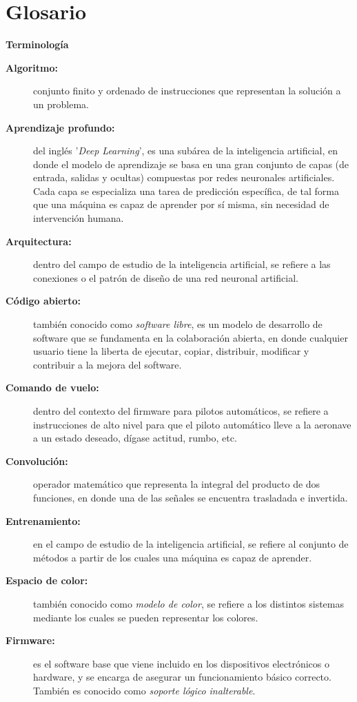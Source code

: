 \chapter*{Glosario}

\textbf{  \normalsize Terminología}
\begin{description}
  \item[\textbf{Algoritmo:}] conjunto finito y ordenado de instrucciones que representan la solución a un problema.
  \item[\textbf{Aprendizaje profundo:}] del inglés '\textit{Deep Learning}', es una subárea de la inteligencia artificial, en donde el modelo de aprendizaje se basa en una gran conjunto de capas (de entrada, salidas y ocultas) compuestas por redes neuronales artificiales. Cada capa se especializa una tarea de predicción específica, de tal forma que una máquina es capaz de aprender por sí misma, sin necesidad de intervención humana.
  \item[\textbf{Arquitectura:}] dentro del campo de estudio de la inteligencia artificial, se refiere a las conexiones o el patrón de diseño de una red neuronal artificial.
  \item[\textbf{Código abierto:}] también conocido como \textit{software libre}, es un modelo de desarrollo de software que se fundamenta en la colaboración abierta, en donde cualquier usuario tiene la liberta de ejecutar, copiar, distribuir, modificar y contribuir a la mejora del software. 
  \item[\textbf{Comando de vuelo:}] dentro del contexto del firmware para pilotos automáticos, se refiere a instrucciones de alto nivel para que el piloto automático lleve a la aeronave a un estado deseado, dígase actitud, rumbo, etc.
  \item[\textbf{Convolución:}] operador matemático que representa la integral del producto de dos funciones, en donde una de las señales se encuentra trasladada e invertida. 
  \item[\textbf{Entrenamiento:}] en el campo de estudio de la inteligencia artificial, se refiere al conjunto de métodos a partir de los cuales una máquina es capaz de aprender.
  \item[\textbf{Espacio de color:}] también conocido como \textit{modelo de color}, se refiere a los distintos sistemas mediante los cuales se pueden representar los colores.
  \item[\textbf{Firmware:}] es el software base que viene incluido en los dispositivos electrónicos o hardware, y se encarga de asegurar un funcionamiento básico correcto. También es conocido como \textit{soporte lógico inalterable}.

\end{description}
